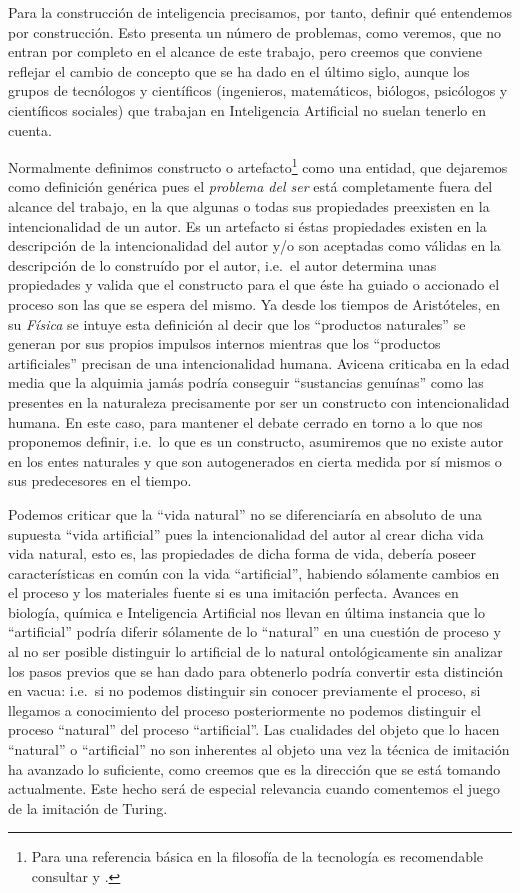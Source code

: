 \documentclass[12pt]{memoir}
\begin{document}
Para la construcción de inteligencia precisamos, por tanto, definir qué entendemos por construcción. Esto presenta un número de problemas, como veremos, que no entran por completo en el alcance de este trabajo, pero creemos que conviene reflejar el cambio de concepto que se ha dado en el último siglo, aunque los grupos de tecnólogos y científicos (ingenieros, matemáticos, biólogos, psicólogos y científicos sociales) que trabajan en Inteligencia Artificial no suelan tenerlo en cuenta. 

Normalmente definimos constructo o artefacto\footnote{Para una referencia básica en la filosofía de la tecnología es recomendable consultar \cite{sep-technology} y \cite{sep-artifact}.} como una entidad, que dejaremos como definición genérica pues el \textit{problema del ser} está completamente fuera del alcance del trabajo, en la que algunas o todas sus propiedades preexisten en la intencionalidad de un autor. Es un artefacto si éstas propiedades existen en la descripción de la intencionalidad del autor y/o son aceptadas como válidas en la descripción de lo construído por el autor, i.e.\ el autor determina unas propiedades y valida que el constructo para el que éste ha guiado o accionado el proceso son las que se espera del mismo. Ya desde los tiempos de Aristóteles, en su \textit{Física} se intuye esta definición al decir que los ``productos naturales'' se generan por sus propios impulsos internos mientras que los ``productos artificiales'' precisan de una intencionalidad humana. Avicena criticaba en la edad media que la alquimia jamás podría conseguir ``sustancias genuínas'' como las presentes en la naturaleza precisamente por ser un constructo con intencionalidad humana. En este caso, para mantener el debate cerrado en torno a lo que nos proponemos definir, i.e.\ lo que es un constructo, asumiremos que no existe autor en los entes naturales y que son autogenerados en cierta medida por sí mismos o sus predecesores en el tiempo.

Podemos criticar que la ``vida natural'' no se diferenciaría en absoluto de una supuesta ``vida artificial'' pues la intencionalidad del autor al crear dicha vida vida natural, esto es, las propiedades de dicha forma de vida, debería poseer características en común con la vida ``artificial'', habiendo sólamente cambios en el proceso y los materiales fuente si es una imitación perfecta. Avances en biología, química e Inteligencia Artificial nos llevan en última instancia que lo ``artificial'' podría diferir sólamente de lo ``natural'' en una cuestión de proceso y al no ser posible distinguir lo artificial de lo natural ontológicamente sin analizar los pasos previos que se han dado para obtenerlo podría convertir esta distinción en vacua: i.e.\ si no podemos distinguir sin conocer previamente el proceso, si llegamos a conocimiento del proceso posteriormente no podemos distinguir el proceso ``natural'' del proceso ``artificial''. Las cualidades del objeto que lo hacen ``natural'' o ``artificial'' no son inherentes al objeto una vez la técnica de imitación ha avanzado lo suficiente, como creemos que es la dirección que se está tomando actualmente. Este hecho será de especial relevancia cuando comentemos el juego de la imitación de Turing.
\end{document}
